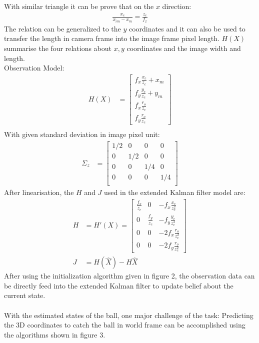 \documentclass[a4paper]{article}
\begin{document}
With similar triangle it can be prove that on the $x$ direction:
\begin{align*}
\frac{x_c}{x_{im} - x_m} = \frac{z_c}{f_x}
\end{align*}
The relation can be generalized to the $y$ coordinates and it can also be used to transfer the length in camera frame into the image frame pixel length. $H(X)$ summarise the four relations about $x,y$ coordinates and the image width and length. \\
Observation Model:
\begin{align*}
H(X) &= \begin{bmatrix}
f_x \frac{x_c}{z_c} + x_m \\
f_y \frac{y_c}{z_c} + y_m \\
f_x \frac{r_o}{z_c} \\
f_y \frac{r_o}{z_c}
\end{bmatrix} \\
\end{align*}
With given standard deviation in image pixel unit:
\begin{align*}
\Sigma_{z} &= \begin{bmatrix}
1/2 & 0 & 0 & 0 \\
0 & 1/2 & 0 & 0 \\
0 & 0 & 1/4 & 0 \\
0 & 0 & 0 & 1/4 \\
\end{bmatrix}
\end{align*}
After linearisation, the $H$ and $J$ used in the extended Kalman filter model are:
\begin{align*}
H &= H'(X) = \begin{bmatrix}
\frac{f_x}{z_c}& 0& -f_x\frac{x_c}{z_c^2} \\
0 & \frac{f_y}{z_c}& -f_y \frac{y_c}{z_c^2} \\
0 & 0 & -2f_x\frac{r_o}{z_c^2} \\
0 & 0 & -2f_y \frac{r_o}{z_c^2}
\end{bmatrix} \\
J &= H(\hat{X}) - H\hat{X}
\end{align*}
After using the initialization algorithm given in figure 2, the observation data can be directly feed into the extended Kalman filter to update belief about the current state.  \\
\pagebreak
\\
With the estimated states of the ball, one major challenge of the task: Predicting the 3D coordinates to catch the ball in world frame can be accomplished using the algorithms shown in figure 3.
\end{document}
